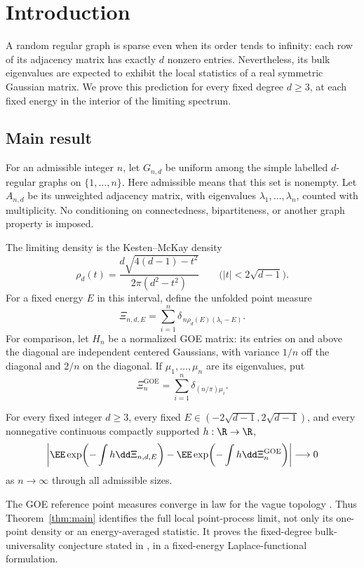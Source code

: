 \section{Introduction}\label{sec:introduction}

A random regular graph is sparse even when its order tends to infinity:
each row of its adjacency matrix has exactly \(d\) nonzero entries.
Nevertheless, its bulk eigenvalues are expected to exhibit the local
statistics of a real symmetric Gaussian matrix.
We prove this prediction for every fixed degree \(d\ge3\), at each fixed
energy in the interior of the limiting spectrum.

\subsection{Main result}

For an admissible integer \(n\), let \(G_{n,d}\) be uniform among the
simple labelled \(d\)-regular graphs on \(\{1,\ldots,n\}\).
Here admissible means that this set is nonempty.
Let \(A_{n,d}\) be its unweighted adjacency matrix, with eigenvalues
\(\lambda_1,\ldots,\lambda_n\), counted with multiplicity.
No conditioning on connectedness, bipartiteness, or another graph
property is imposed.

The limiting density is the Kesten--McKay density
\[
 \rho_d(t)=\frac{d\sqrt{4(d-1)-t^2}}{2\pi(d^2-t^2)}
 \qquad \bigl(|t|<2\sqrt{d-1}\bigr).
\]
For a fixed energy \(E\) in this interval, define the unfolded
point measure
\[
 \Xi_{n,d,E}=\sum_{i=1}^n
       \delta_{\,n\rho_d(E)(\lambda_i-E)}.
\]
For comparison, let \(H_n\) be a normalized GOE matrix: its entries on
and above the diagonal are independent centered Gaussians, with
variance \(1/n\) off the diagonal and \(2/n\) on the diagonal.
If \(\mu_1,\ldots,\mu_n\) are its eigenvalues, put
\[
 \Xi_n^{\mathrm{GOE}}
       =\sum_{i=1}^n\delta_{(n/\pi)\mu_i}.
\]

\newpage
\begin{theorem}\label{thm:main}
For every fixed integer \(d\ge3\), every fixed
\(E\in(-2\sqrt{d-1},2\sqrt{d-1})\), and every nonnegative continuous
compactly supported \(h:\R\to\R\),
\[
 \left|
 \EE\exp\!\left(-\int h\dd\Xi_{n,d,E}\right)
 -
 \EE\exp\!\left(-\int h\dd\Xi_n^{\mathrm{GOE}}\right)
 \right|\longrightarrow0
\]
as \(n\to\infty\) through all admissible sizes.
\end{theorem}

The GOE reference point measures converge in law for the vague
topology \cite{ValkoVirag}.
Thus Theorem~\ref{thm:main} identifies the full local point-process
limit, not only its one-point density or an energy-averaged statistic.
It proves the fixed-degree bulk-universality conjecture stated in
\cite[Conjecture 2.11]{BourgadeHuang}, in a fixed-energy
Laplace-functional formulation.

